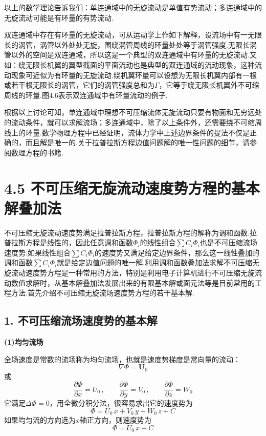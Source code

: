 以上的数学理论告诉我们：单连通域中的无旋流动是单值有势流动；多连通域中的无旋流动可能是有环量的有势流动.

双连通域中存在有环量的无旋流动，可从运动学上作如下解释，设流场中有一无限长的涡管，涡管以外处处无旋，围绕涡管周线的环量处处等于涡管强度.无限长涡管以外的空间是双连通域，所以这是一个典型的双连通域中有环量的无旋流动.又如：绕无限长机翼的翼型截面的平面流动也是典型的双连通域的流动现象，这种流动现象可近似为有环量的无旋流动.绕机翼环量可以设想为无限长机翼内部有一根或若干根无限长的涡管，它们的涡管强度总和为$\Gamma$，它等于绕无限长机翼外不可缩周线的环量.图4.6表示双连通域中有环量流动的例子.

根据以上讨论可知，单连通域中理想不可压缩流体无旋流动只要有物面和无穷远处的流动条件，就可以求解流场；多连通域中，除了以上条件外，还需要绕不可缩周线上的环量.数学物理方程中已经证明，流体力学中上述边界条件的提法不仅是正确的，而且解是唯一的.关于拉普拉斯方程边值问题解的唯一性问题的细节，请参阅数理方程的书籍.

\section*{4.5  不可压缩无旋流动速度势方程的基本解叠加法}

不可压缩无旋流动速度势满足拉普拉斯方程，拉普拉斯方程的解称为调和函数.拉普拉斯方程是线性的，因此任意调和函数$\Phi_i$的线性组合$\sum C_i\Phi_i$也是不可压缩流场速度势.如果线性组合$\sum C_i\Phi_i$的速度势又满足给定边界条件，那么这一线性叠加的调和函数$\sum C_i\Phi_i$就是给定边值问题的唯一解.利用调和函数叠加法求解不可压缩无旋流动速度势方程是一种常用的方法，特别是利用电子计算机进行不可压缩无旋流动数值求解时，从基本解叠加法发展出来的有限基本解或面元法等是目前常用的工程方法.首先介绍不可压缩无旋流场速度势方程的若干基本解.

\subsection*{1. 不可压缩流场速度势的基本解}

\textbf{(1)均匀流场}

全场速度是常数的流场称为均匀流场，也就是速度势梯度是常向量的流动：
\[
\nabla\Phi=\boldsymbol{U}_0
\]
或
\[
\frac{\partial\Phi}{\partial x}=U_0\,,\qquad \frac{\partial\Phi}{\partial y}=V_0\,,\qquad \frac{\partial\Phi}{\partial z}=W_0
\]
它满足$\Delta\Phi=0$，用全微分积分法，很容易求出它的速度势为
\begin{equation*}
\Phi=U_0\,x+V_0\,y+W_0\,z+C
\tag{4.39}
\end{equation*}
如果均匀流的方向选为$x$轴正方向，则速度势为
\[
\Phi=U_0\,x+C
\]

